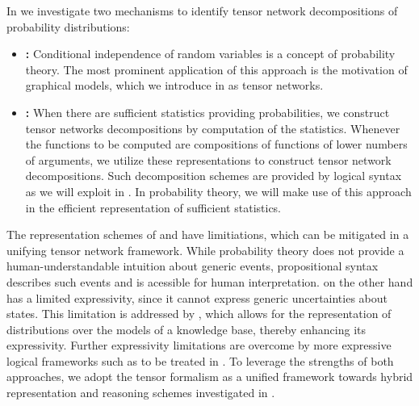 In  we investigate two mechanisms to identify tensor network decompositions of probability distributions:
\begin{itemize}
    \item \textbf{\IndependenceMechanism{}:} Conditional independence of random variables is a concept of probability theory.
    The most prominent application of this approach is the motivation of graphical models, which we introduce in  as tensor networks.
    \item \textbf{\ComputationMechanism{}:} When there are sufficient statistics providing probabilities, we construct tensor networks decompositions by computation of the statistics.
    Whenever the functions to be computed are compositions of functions of lower numbers of arguments, we utilize these representations to construct tensor network decompositions.
    Such decomposition schemes are provided by logical syntax as we will exploit in .
    In probability theory, we will make use of this approach in the efficient representation of sufficient statistics.
\end{itemize}
The representation schemes of \probabilityTheory{} and \propositionalLogic{} have limitiations, which can be mitigated in a unifying tensor network framework.
While probability theory does not provide a human-understandable intuition about generic events, propositional syntax describes such events and is acessible for human interpretation.
\PropositionalLogic{} on the other hand has a limited expressivity, since it cannot express generic uncertainties about states.
This limitation is addressed by \probabilityTheory{}, which allows for the representation of distributions over the models of a knowledge base, thereby enhancing its expressivity.
Further expressivity limitations are overcome by more expressive logical frameworks such as \firstOrderLogic{} to be treated in .
To leverage the strengths of both approaches, we adopt the tensor formalism as a unified framework towards hybrid representation and reasoning schemes investigated in .



